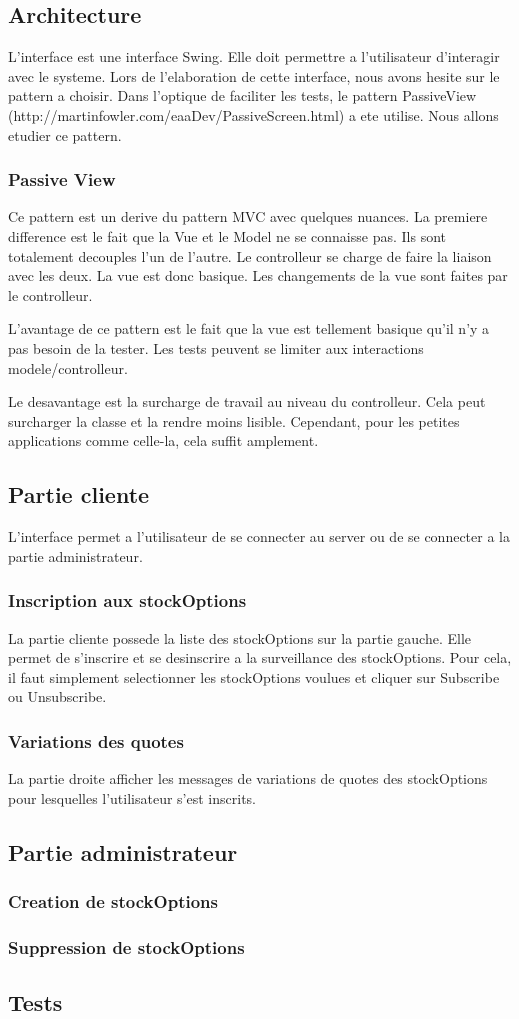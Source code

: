 \subsection{Architecture}
L'interface est une interface Swing. Elle doit permettre a l'utilisateur d'interagir avec le systeme. Lors de l'elaboration de cette interface, nous avons hesite sur le pattern a choisir. Dans l'optique de faciliter les tests, le pattern PassiveView (http://martinfowler.com/eaaDev/PassiveScreen.html) a ete utilise. Nous allons etudier ce pattern.
\subsubsection{Passive View}
Ce pattern est un derive du pattern MVC avec quelques nuances. La premiere difference est le fait que la Vue et le Model ne se connaisse pas. Ils sont totalement decouples l'un de l'autre. Le controlleur se charge de faire la liaison avec les deux. La vue est donc basique. Les changements de la vue sont faites par le controlleur.

L'avantage de ce pattern est le fait que la vue est tellement basique qu'il n'y a pas besoin de la tester. Les tests peuvent se limiter aux interactions modele/controlleur.

Le desavantage est la surcharge de travail au niveau du controlleur. Cela peut surcharger la classe et la rendre moins lisible. Cependant, pour les petites applications comme celle-la, cela suffit amplement.
\subsection{Partie cliente}
L'interface permet a l'utilisateur de se connecter au server ou de se connecter a la partie administrateur.
\subsubsection{Inscription aux stockOptions}
La partie cliente possede la liste des stockOptions sur la partie gauche. Elle permet de s'inscrire et se desinscrire a la surveillance des stockOptions. Pour cela, il faut simplement selectionner les stockOptions voulues et cliquer sur Subscribe ou Unsubscribe.
\subsubsection{Variations des quotes}
La partie droite afficher les messages de variations de quotes des stockOptions pour lesquelles l'utilisateur s'est inscrits.
\subsection{Partie administrateur}
\subsubsection{Creation de stockOptions}
\subsubsection{Suppression de stockOptions}
\subsection{Tests}